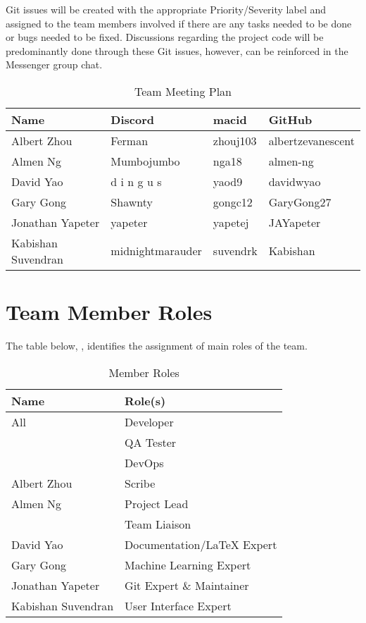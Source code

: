 \documentclass[12pt,letterpaper]{article}
\begin{document}
Git issues will be created with the appropriate Priority/Severity label and
assigned to the team members involved if there are any tasks needed to be done
or bugs needed to be fixed. Discussions regarding the project code will be
predominantly done through these Git issues, however, can be reinforced in the
Messenger group chat.

\begin{table}[hp]
\begin{tabularx}{\textwidth}{|l|X|X|X|}
\toprule
\textbf{Name} & \textbf{Discord} & \textbf{macid} & \textbf{GitHub}\\
\midrule
Albert Zhou & Ferman & zhouj103 & albertzevanescent\\
Almen Ng & Mumbojumbo & nga18 & almen-ng\\
David Yao & d i n g u s & yaod9 & davidwyao\\
Gary Gong & Shawnty & gongc12 & GaryGong27\\
Jonathan Yapeter & yapeter & yapetej & JAYapeter\\
Kabishan Suvendran & midnightmarauder & suvendrk & Kabishan\\
\bottomrule
\end{tabularx}
\caption{Team Meeting Plan} \label{tab:teamMeetingPlan}
\end{table}

\section{Team Member Roles}
The table below, , identifies the assignment of main
roles of the team.
\begin{table}[hp!] 
    \centering
    \begin{tabularx}{\textwidth}{|X|X|}
        \toprule
        \textbf{Name} & \textbf{Role(s)}\\
        \midrule
        All                         & Developer\\
                                    & QA Tester\\
                                    & DevOps \\
        \hline
        Albert Zhou                 & Scribe\\
        \hline
        Almen Ng                    & Project Lead\\
        & Team Liaison\\
        \hline
        David Yao                   & Documentation/LaTeX Expert\\
        \hline
        Gary Gong                   & Machine Learning Expert \\
        \hline
        Jonathan Yapeter            & Git Expert \& Maintainer\\
        \hline
        Kabishan Suvendran          & User Interface Expert\\
        \bottomrule
    \end{tabularx}
\caption{Member Roles} \label{tab:memberRoles}
\end{table}
\end{document}
